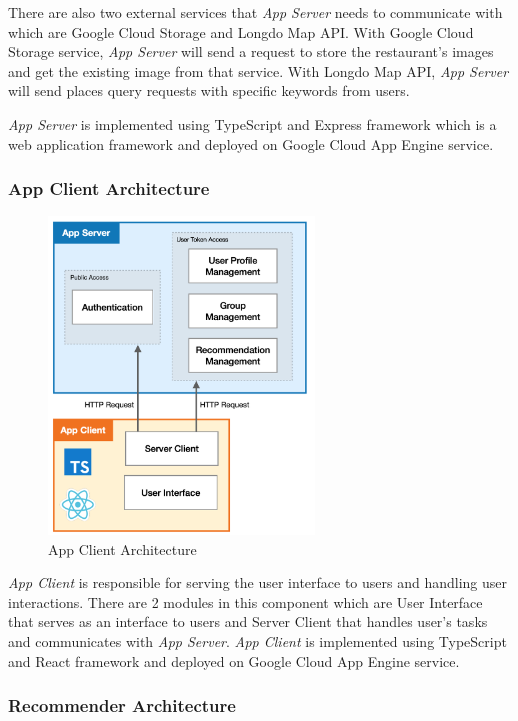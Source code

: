 \documentclass[12pt,oneside,openright,a4paper]{cpe-english-project}
\begin{document}
There are also two external services that \textit{App Server} needs to communicate with which are Google Cloud Storage and Longdo Map API. With Google Cloud Storage service, \textit{App Server} will send a request to store the restaurant’s images and get the existing image from that service. With Longdo Map API, \textit{App Server} will send places query requests with specific keywords from users. 

\textit{App Server} is implemented using TypeScript and Express framework which is a web application framework and deployed on Google Cloud App Engine service.


\subsubsection{App Client Architecture}

\begin{figure}[H]\centering
\includegraphics[width=200pt]{./images/3arch_appclient.png}
\caption{App Client Architecture}\label{fig:3arch_appclient}
\end{figure}\vspace{-24pt}

\textit{App Client} is responsible for serving the user interface to users and handling user interactions. There are 2 modules in this component which are User Interface that serves as an interface to users and Server Client that handles user’s tasks and communicates with \textit{App Server}. \textit{App Client} is implemented using TypeScript and React framework and deployed on Google Cloud App Engine service.


\subsubsection{Recommender Architecture}
\end{document}
